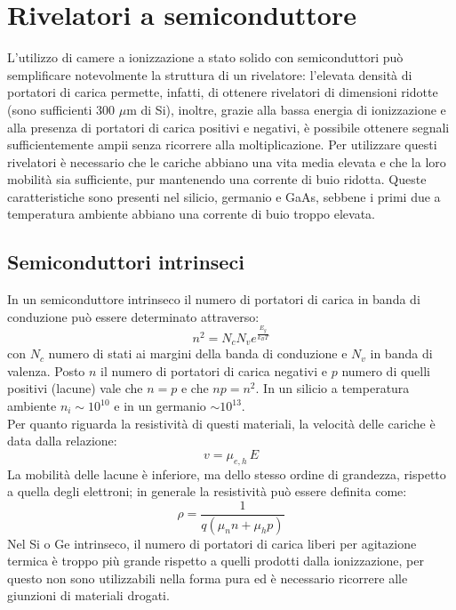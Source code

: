 \chapter{Rivelatori a semiconduttore}
L'utilizzo di camere a ionizzazione a stato solido con semiconduttori pu\`o semplificare notevolmente la struttura di un rivelatore:
l'elevata densit\`a di portatori di carica permette, infatti, di ottenere rivelatori di dimensioni ridotte (sono sufficienti 300 $\mu$m di Si), inoltre,
grazie alla bassa energia di ionizzazione e alla presenza di portatori di carica positivi e negativi, \`e possibile ottenere segnali sufficientemente
ampii senza ricorrere alla moltiplicazione.
Per utilizzare questi rivelatori \`e necessario che le cariche abbiano una vita media elevata e che la loro mobilit\`a sia sufficiente, pur mantenendo
una corrente di buio ridotta.
Queste caratteristiche sono presenti nel silicio, germanio e GaAs, sebbene i primi due a temperatura ambiente abbiano una corrente di buio troppo elevata.
\section{Semiconduttori intrinseci}
In un semiconduttore intrinseco il numero di portatori di carica in banda di conduzione pu\`o essere determinato attraverso:
\begin{equation*}
n^2 = N_c N_v e^{\frac{E_g}{k_B T}}
\end{equation*}
con $N_c$ numero di stati ai margini della banda di conduzione e $N_v$ in banda di valenza.
Posto $n$ il numero di portatori di carica negativi e $p$ numero di quelli positivi (lacune) vale
che $n=p$ e che $np=n^2$.
In un silicio a temperatura ambiente $n_i \sim 10^{10}$ e in un germanio $\sim 10^{13}$.\\
Per quanto riguarda la resistivit\`a di questi materiali, la velocit\`a delle cariche \`e data dalla relazione:
\begin{equation*}
v = \mu_{e,h} \, E
\end{equation*}
La mobilit\`a delle lacune \`e inferiore, ma dello stesso ordine di grandezza, rispetto a quella degli elettroni;
in generale la resistivit\`a pu\`o essere definita come:
\begin{equation*}
\rho = \frac{1}{q(\mu_n n + \mu_h p)}
\end{equation*}
Nel Si o Ge intrinseco, il numero di portatori di carica liberi per agitazione termica \`e troppo pi\`u grande rispetto a quelli prodotti
dalla ionizzazione, per questo non sono utilizzabili nella forma pura ed \`e necessario ricorrere alle giunzioni di materiali drogati.
